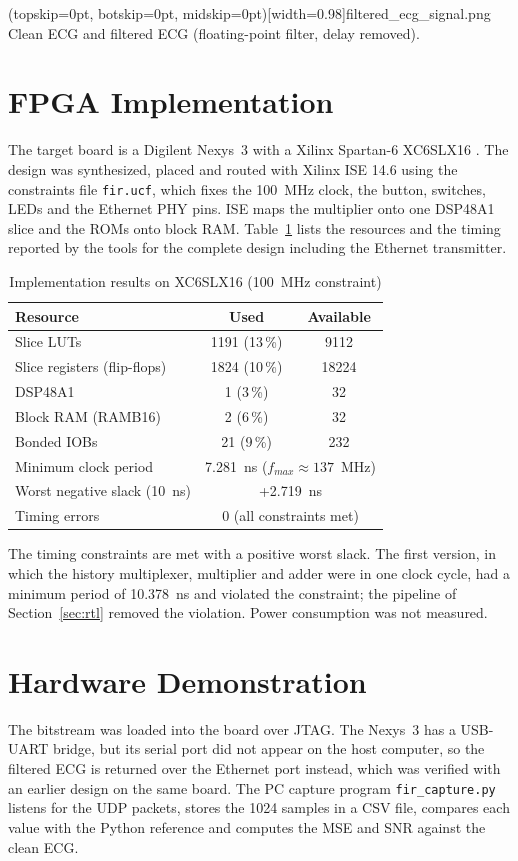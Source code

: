 \documentclass{ieeeaccess}
\newcommand{\resLUT}{1191}
\newcommand{\resFF}{1824}
\newcommand{\resDSP}{1}
\newcommand{\resBRAM}{2}
\newcommand{\resIOB}{21}
\newcommand{\resPeriod}{7.281}
\newcommand{\resWNS}{+2.719}
\newcommand{\resFmax}{137}
\begin{document}
\Figure[t!](topskip=0pt, botskip=0pt, midskip=0pt)[width=0.98\columnwidth]{filtered_ecg_signal.png}
{Clean ECG and filtered ECG (floating-point filter, delay removed).\label{fig:filtered}}

\section{FPGA Implementation}
\label{sec:fpga}
The target board is a Digilent Nexys~3 with a Xilinx Spartan-6 XC6SLX16 \cite{b3}. The design was synthesized, placed and routed with Xilinx ISE 14.6 using the constraints file \texttt{fir.ucf}, which fixes the 100~MHz clock, the button, switches, LEDs and the Ethernet PHY pins. ISE maps the multiplier onto one DSP48A1 slice \cite{b4} and the ROMs onto block RAM. Table~\ref{tab:res} lists the resources and the timing reported by the tools for the complete design including the Ethernet transmitter.

\begin{table}[!t]
\caption{Implementation results on XC6SLX16 (100~MHz constraint)}
\label{tab:res}
\centering
\begin{tabular}{lcc}
\toprule
Resource & Used & Available \\
\midrule
Slice LUTs & \resLUT{} (13\,\%) & 9112 \\
Slice registers (flip-flops) & \resFF{} (10\,\%) & 18224 \\
DSP48A1 & \resDSP{} (3\,\%) & 32 \\
Block RAM (RAMB16) & \resBRAM{} (6\,\%) & 32 \\
Bonded IOBs & \resIOB{} (9\,\%) & 232 \\
\midrule
Minimum clock period & \multicolumn{2}{c}{\resPeriod{}~ns ($f_{max}\approx\resFmax$~MHz)} \\
Worst negative slack (10~ns) & \multicolumn{2}{c}{\resWNS{}~ns} \\
Timing errors & \multicolumn{2}{c}{0 (all constraints met)} \\
\bottomrule
\end{tabular}
\end{table}

The timing constraints are met with a positive worst slack. The first version, in which the history multiplexer, multiplier and adder were in one clock cycle, had a minimum period of 10.378~ns and violated the constraint; the pipeline of Section~\ref{sec:rtl} removed the violation. Power consumption was not measured.

\section{Hardware Demonstration}
\label{sec:demo}
The bitstream was loaded into the board over JTAG. The Nexys~3 has a USB-UART bridge, but its serial port did not appear on the host computer, so the filtered ECG is returned over the Ethernet port instead, which was verified with an earlier design on the same board. The PC capture program \texttt{fir\_capture.py} listens for the UDP packets, stores the 1024 samples in a CSV file, compares each value with the Python reference and computes the MSE and SNR against the clean ECG.
\end{document}
